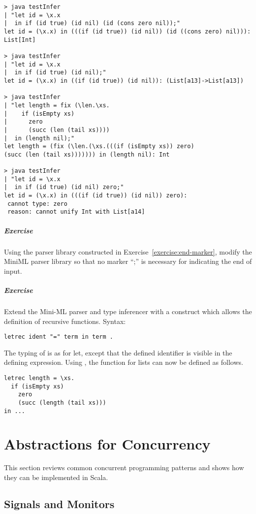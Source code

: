 \documentclass[a4paper,12pt,twoside,titlepage]{book}
\newcommand{\exercise}{\paragraph{Exercise}}
\begin{document}
{\begin{lstlisting}
> java testInfer 
| "let id = \x.x  
|  in if (id true) (id nil) (id (cons zero nil));"
let id = (\x.x) in (((if (id true)) (id nil)) (id ((cons zero) nil))): List[Int]

> java testInfer
| "let id = \x.x 
|  in if (id true) (id nil);"
let id = (\x.x) in ((if (id true)) (id nil)): (List[a13]->List[a13])

> java testInfer
| "let length = fix (\len.\xs.
|    if (isEmpty xs) 
|      zero 
|      (succ (len (tail xs))))
|  in (length nil);"
let length = (fix (\len.(\xs.(((if (isEmpty xs)) zero) 
(succ (len (tail xs))))))) in (length nil): Int

> java testInfer 
| "let id = \x.x 
|  in if (id true) (id nil) zero;"
let id = (\x.x) in (((if (id true)) (id nil)) zero): 
 cannot type: zero
 reason: cannot unify Int with List[a14]
\end{lstlisting}

\exercise\label{exercise:hm-parse} Using the parser library constructed in
Exercise~\ref{exercise:end-marker}, modify the MiniML parser library
so that no marker ``;'' is necessary for indicating the end of input.

\exercise\label{execcise:hm-extend} Extend the Mini-ML parser and type
inferencer with a  construct which allows the definition of
recursive functions. Syntax:
\begin{lstlisting}
letrec ident "=" term in term .
\end{lstlisting}
The typing of  is as for {let}, 
except that the defined identifier is visible in the defining expression. Using , the  function for lists can now be defined as follows.
\begin{lstlisting}
letrec length = \xs.
  if (isEmpty xs)
    zero
    (succ (length (tail xs)))
in ...
\end{lstlisting}

\chapter{Abstractions for Concurrency}\label{sec:ex-concurrency}

This section reviews common concurrent programming patterns and shows
how they can be implemented in Scala.

\section{Signals and Monitors}

}
\end{document}
